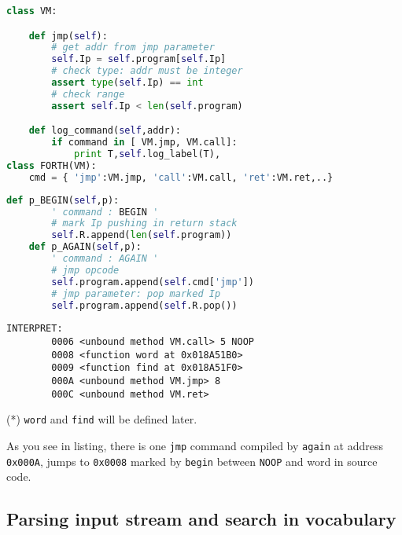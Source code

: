 \begin{lstlisting}[language=Python]
class VM:

	def jmp(self):
		# get addr from jmp parameter
		self.Ip = self.program[self.Ip]
		# check type: addr must be integer
		assert type(self.Ip) == int
		# check range
		assert self.Ip < len(self.program)	

	def log_command(self,addr):
		if command in [ VM.jmp, VM.call]:
			print T,self.log_label(T),
class FORTH(VM):
	cmd = { 'jmp':VM.jmp, 'call':VM.call, 'ret':VM.ret,..}
\end{lstlisting}

\begin{lstlisting}[language=Python]
 	def p_BEGIN(self,p):
		' command : BEGIN '
		# mark Ip pushing in return stack
		self.R.append(len(self.program))
 	def p_AGAIN(self,p):
		' command : AGAIN '
		# jmp opcode
		self.program.append(self.cmd['jmp'])
		# jmp parameter: pop marked Ip
		self.program.append(self.R.pop())
\end{lstlisting}

\begin{lstlisting}
INTERPRET:
        0006 <unbound method VM.call> 5 NOOP
        0008 <function word at 0x018A51B0>
        0009 <function find at 0x018A51F0>
        000A <unbound method VM.jmp> 8
        000C <unbound method VM.ret>
\end{lstlisting}

\noindent
(*) \verb|word| and \verb|find| will be defined later.
\bigskip

As you see in listing, there is one \verb|jmp| command compiled by \verb|again|
at address \verb|0x000A|, jumps to \verb|0x0008| marked by \verb|begin| between
\verb|NOOP| and word in source code.

\clearpage
\subsection{Parsing input stream and search in vocabulary}

